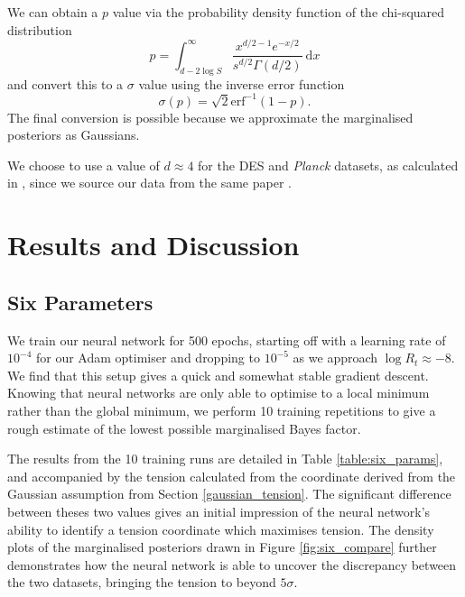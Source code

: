 \documentclass[%
 reprint,
 amsmath,amssymb,
 aps,
]{revtex4-2}
\begin{document}
We can obtain a $p$ value via the probability density function of the chi-squared distribution
\begin{equation}
    p = \int_{d - 2 \log S}^{\infty} \frac{x^{d/2 - 1} e^{-x/2}}{s^{d/2} \Gamma(d/2)} \ \textrm{d} x
\end{equation}
and convert this to a $\sigma$ value using the inverse error function
\begin{equation}
    \sigma (p) = \sqrt{2} \textrm{erf}^{-1} (1 - p).
\end{equation}
The final conversion is possible because we approximate the marginalised posteriors as Gaussians.

We choose to use a value of $d \approx 4$ for the DES and \textit{Planck} datasets, as calculated in \cite{Handley2019}, since we source our data from the same paper \cite{Dataset}.



\section{Results and Discussion}

\subsection{Six Parameters} \label{section:six}

We train our neural network for 500 epochs, starting off with a learning rate of $10^{-4}$ for our Adam optimiser and dropping to $10^{-5}$ as we approach $\log R_t \approx -8$. We find that this setup gives a quick and somewhat stable gradient descent. Knowing that neural networks are only able to optimise to a local minimum rather than the global minimum, we perform 10 training repetitions to give a rough estimate of the lowest possible marginalised Bayes factor. 

The results from the 10 training runs are detailed in Table \ref{table:six_params}, and accompanied by the tension calculated from the coordinate derived from the Gaussian assumption from Section \ref{gaussian_tension}. The significant difference between theses two values gives an initial impression of the neural network's ability to identify a tension coordinate which maximises tension. The density plots of the marginalised posteriors drawn in Figure \ref{fig:six_compare} further demonstrates how the neural network is able to uncover the discrepancy between the two datasets, bringing the tension to beyond $5\sigma$.
\end{document}

